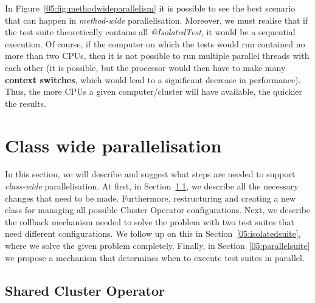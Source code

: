 In Figure~\ref {05:fig:methodwideparallelism} it is possible to see the best scenario that can happen in \emph {method-wide} parallelisation.
Moreover, we must realise that if the test suite theoretically contains all \emph{@IsolatedTest}, it would be a sequential execution.
Of course, if the computer on which the tests would run contained no more than two CPUs, then it is not possible to run multiple parallel threads with each other (it is possible, but the processor would then have to make many \textbf{context switches}, which would lead to a significant decrease in performance).
Thus, the more CPUs a given computer/cluster will have available, the quickier the results.

\section{Class wide parallelisation}
\label{04:classwideparalelisation}

In this section, we will describe and suggest what steps are needed to support \emph{class-wide} parallelisation.
At first, in Section~\ref{05:sharedclusteroperator}, we describe all the necessary changes that need to be made.
Furthermore, restructuring and creating a new class for managing all possible Cluster Operator configurations.
Next, we describe the rollback mechanism needed to solve the problem with two test suites that need different configurations.
We follow up on this in Section~\ref{05:isolatedsuite}, where we solve the given problem completely.
Finally, in Section~\ref{05:parallelsuite} we propose a mechanism that determines when to execute test suites in parallel.

\subsection{Shared Cluster Operator}
\label{05:sharedclusteroperator}

